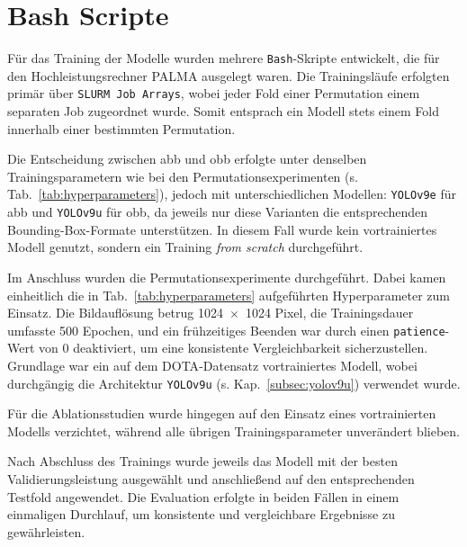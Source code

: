 \section{Bash Scripte}

Für das Training der Modelle wurden mehrere \texttt{Bash}-Skripte entwickelt, die für den Hochleistungsrechner \acrshort{PALMA} ausgelegt waren. Die Trainingsläufe erfolgten primär über \texttt{\acrshort{SLURM} Job Arrays}, wobei jeder Fold einer Permutation einem separaten Job zugeordnet wurde. Somit entsprach ein Modell stets einem Fold innerhalb einer bestimmten Permutation.  

Die Entscheidung zwischen \acrlong{abb} und \acrlong{obb} erfolgte unter denselben Trainingsparametern wie bei den Permutationsexperimenten (s. Tab.~\ref{tab:hyperparameters}), jedoch mit unterschiedlichen Modellen: \texttt{YOLOv9e} für \acrshort{abb} und \texttt{YOLOv9u} für \acrshort{obb}, da jeweils nur diese Varianten die entsprechenden Bounding-Box-Formate unterstützen. In diesem Fall wurde kein vortrainiertes Modell genutzt, sondern ein Training \textit{from scratch} durchgeführt.  

Im Anschluss wurden die Permutationsexperimente durchgeführt. Dabei kamen einheitlich die in Tab.~\ref{tab:hyperparameters} aufgeführten Hyperparameter zum Einsatz. Die Bildauflösung betrug 1024~$\times$~1024 Pixel, die Trainingsdauer umfasste 500 Epochen, und ein frühzeitiges Beenden war durch einen \texttt{patience}-Wert von 0 deaktiviert, um eine konsistente Vergleichbarkeit sicherzustellen. Grundlage war ein auf dem \acrshort{DOTA}-Datensatz vortrainiertes Modell, wobei durchgängig die Architektur \texttt{YOLOv9u} (s. Kap.~\ref{subsec:yolov9u}) verwendet wurde.  

Für die Ablationsstudien wurde hingegen auf den Einsatz eines vortrainierten Modells verzichtet, während alle übrigen Trainingsparameter unverändert blieben.  

Nach Abschluss des Trainings wurde jeweils das Modell mit der besten Validierungsleistung ausgewählt und anschließend auf den entsprechenden Testfold angewendet. Die Evaluation erfolgte in beiden Fällen in einem einmaligen Durchlauf, um konsistente und vergleichbare Ergebnisse zu gewährleisten.  



